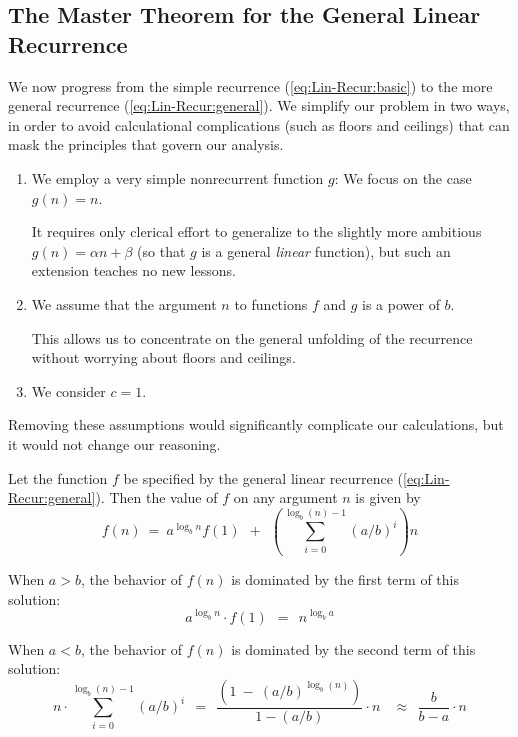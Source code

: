 \subsection{The Master Theorem for the General Linear Recurrence} 
\label{sec:linear-recurrence-general}

We now progress from the simple recurrence (\ref{eq:Lin-Recur:basic}) to
the more general recurrence (\ref{eq:Lin-Recur:general}).  We simplify
our problem in two ways, in order to avoid calculational complications
(such as floors and ceilings) that can mask the principles that govern
our analysis.
\begin{enumerate}
\item
We employ a very simple nonrecurrent function $g$: We focus on the
case $g(n) = n$.

It requires only clerical effort to generalize to the slightly more
ambitious $g(n) = \alpha n + \beta$ (so that $g$ is a general {\em
  linear} function), but such an extension teaches no new lessons.
\item
We assume that the argument $n$ to functions $f$ and $g$ is a power of
$b$.

This allows us to concentrate on the general unfolding of the
recurrence without worrying about floors and ceilings.

\item We consider $c=1$.
\end{enumerate}
Removing these assumptions would significantly complicate our
calculations, but it would not change our reasoning.

\begin{theorem}
\label{thm:master-thm-genl}
Let the function $f$ be specified by the general linear recurrence
(\ref{eq:Lin-Recur:general}).  Then the value of $f$ on any argument
$n$ is given by
\[
f(n) \ = \ 
a^{\log_b n} f(1) \ \ + \ \ \left( \sum_{i=0}^{\log_b (n)-1} (a/b)^i \right) n
\]

\noindent
When $a > b$, the behavior of $f(n)$ is dominated by the first
term of this solution:
\[ a^{\log_b n} \cdot  f(1) \ \ = \ \ n^{\log_b a} \]

\noindent
When $a < b$, the behavior of $f(n)$ is dominated by the second
term of this solution:
\[
n \cdot \sum_{i=0}^{\log_b (n)-1} (a/b)^i
  \ \ = \ \
\frac{\left( 1 \ - \  (a/b)^{\log_b (n)} \right)}{1- (a/b)} \cdot n \ \
  \ \ \approx \ \
\frac{b}{b - a} \cdot n
\]
\end{theorem}

